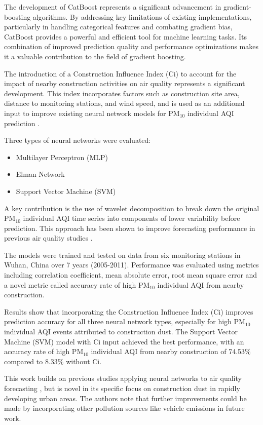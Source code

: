 \documentclass{book}
\numberwithin{equation}{section}
\numberwithin{figure}{section}
\begin{document}
The development of CatBoost represents a significant advancement in gradient-boosting algorithms. By addressing key limitations of existing implementations, particularly in handling categorical features and combating gradient bias, CatBoost provides a powerful and efficient tool for machine learning tasks. Its combination of improved prediction quality and performance optimizations makes it a valuable contribution to the field of gradient boosting.

The introduction of a Construction Influence Index (Ci) to account for the impact of nearby construction activities on air quality represents a significant development. This index incorporates factors such as construction site area, distance to monitoring stations, and wind speed, and is used as an additional input to improve existing neural network models for PM$_{10}$ individual AQI prediction \citep{feng2013}.

Three types of neural networks were evaluated:
\begin{itemize}
    \item Multilayer Perceptron (MLP)
    \item Elman Network
    \item Support Vector Machine (SVM)
\end{itemize}

A key contribution is the use of wavelet decomposition to break down the original PM$_{10}$ individual AQI time series into components of lower variability before prediction. This approach has been shown to improve forecasting performance in previous air quality studies \citep{osowski2007} \citep{siwek2009}.

The models were trained and tested on data from six monitoring stations in Wuhan, China over 7 years (2005-2011). Performance was evaluated using metrics including correlation coefficient, mean absolute error, root mean square error and a novel metric called accuracy rate of high PM$_{10}$ individual AQI from nearby construction.

Results show that incorporating the Construction Influence Index (Ci) improves prediction accuracy for all three neural network types, especially for high PM$_{10}$ individual AQI events attributed to construction dust. The Support Vector Machine (SVM) model with Ci input achieved the best performance, with an accuracy rate of high PM$_{10}$ individual AQI from nearby construction of 74.53\% compared to 8.33\% without Ci.

This work builds on previous studies applying neural networks to air quality forecasting \citep{kukkonen2003} \citep{jiang2004} \citep{hooyberghs2005}, but is novel in its specific focus on construction dust in rapidly developing urban areas. The authors note that further improvements could be made by incorporating other pollution sources like vehicle emissions in future work.
\end{document}
